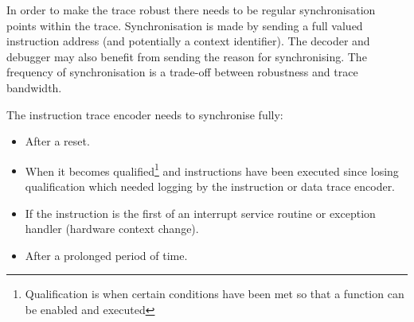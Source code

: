 In order to make the trace robust there needs to be regular
synchronisation points within the trace. Synchronisation is made by
sending a full valued instruction address (and potentially a context
identifier). The decoder and debugger may also benefit from sending
the reason for synchronising. The frequency of synchronisation is a
trade-off between robustness and trace bandwidth.

The instruction trace encoder needs to synchronise fully:

\begin{itemize}

\item After a reset.
  \item When it becomes qualified\footnote{Qualification is when certain conditions have been met so that a function can be enabled and executed} and instructions have been executed since losing qualification which needed logging by the instruction or data trace encoder.
\item If the instruction is the first of an interrupt service routine or
exception handler (hardware context change).
\item After a prolonged period of time.
\end{itemize}
